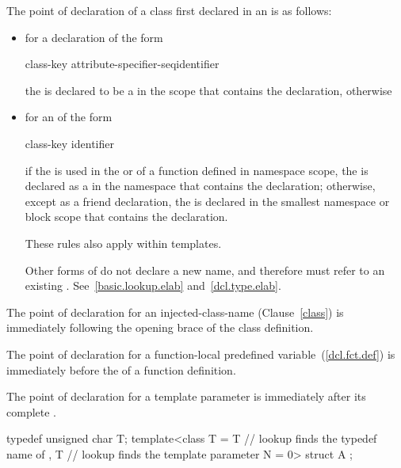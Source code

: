 \pnum
The point of declaration of a class first declared in an
 is as follows:
\begin{itemize}
\item for a declaration of the form

\begin{ncbnf}
class-key attribute-specifier-seq\opt identifier \terminal{;}
\end{ncbnf}

the  is declared to be a
 in the scope that contains the declaration,
otherwise
\item for an  of the form

\begin{ncbnf}
class-key identifier
\end{ncbnf}

if the
 is used in the
 or 
of a function defined in namespace scope, the  is
declared as a  in the namespace that contains the
declaration; otherwise, except as a friend declaration, the
 is declared in the smallest namespace or block
scope that contains the declaration. \begin{note}
These rules also apply within templates. \end{note} \begin{note} Other
forms of  do not declare a new name,
and therefore must refer to an existing .
See~\ref{basic.lookup.elab} and~\ref{dcl.type.elab}. \end{note}
\end{itemize}

\pnum
The point of declaration for an
injected-class-name (Clause~\ref{class}) is immediately following
the opening brace of the class definition.

\pnum
The point of declaration for a function-local predefined
variable~(\ref{dcl.fct.def}) is immediately before the
 of a function definition.

\pnum
The point of declaration for a template parameter is immediately after its complete
. \begin{example}

\begin{codeblock}
typedef unsigned char T;
template<class T
  = T     // lookup finds the typedef name of 
  , T     // lookup finds the template parameter
    N = 0> struct A { };
\end{codeblock}
\end{example}

